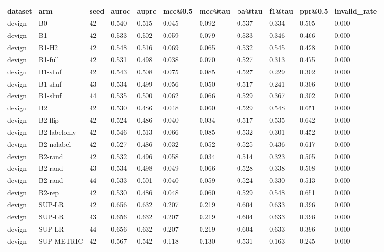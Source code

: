 \begin{tabular}{lllllllllll}
\toprule
dataset & arm & seed & auroc & auprc & mcc@0.5 & mcc@tau & ba@tau & f1@tau & ppr@0.5 & invalid\_rate \\
\midrule
devign & B0 & 42 & 0.540 & 0.515 & 0.045 & 0.092 & 0.537 & 0.334 & 0.505 & 0.000 \\
devign & B1 & 42 & 0.533 & 0.502 & 0.059 & 0.079 & 0.533 & 0.346 & 0.466 & 0.000 \\
devign & B1-H2 & 42 & 0.548 & 0.516 & 0.069 & 0.065 & 0.532 & 0.545 & 0.428 & 0.000 \\
devign & B1-full & 42 & 0.531 & 0.498 & 0.038 & 0.070 & 0.527 & 0.313 & 0.475 & 0.000 \\
devign & B1-shuf & 42 & 0.543 & 0.508 & 0.075 & 0.085 & 0.527 & 0.229 & 0.302 & 0.000 \\
devign & B1-shuf & 43 & 0.534 & 0.499 & 0.056 & 0.050 & 0.517 & 0.241 & 0.306 & 0.000 \\
devign & B1-shuf & 44 & 0.535 & 0.500 & 0.062 & 0.066 & 0.529 & 0.367 & 0.302 & 0.000 \\
devign & B2 & 42 & 0.530 & 0.486 & 0.048 & 0.060 & 0.529 & 0.548 & 0.651 & 0.000 \\
devign & B2-flip & 42 & 0.524 & 0.486 & 0.040 & 0.034 & 0.517 & 0.535 & 0.642 & 0.000 \\
devign & B2-labelonly & 42 & 0.546 & 0.513 & 0.066 & 0.085 & 0.532 & 0.301 & 0.452 & 0.000 \\
devign & B2-nolabel & 42 & 0.527 & 0.486 & 0.032 & 0.052 & 0.525 & 0.436 & 0.617 & 0.000 \\
devign & B2-rand & 42 & 0.532 & 0.496 & 0.058 & 0.034 & 0.514 & 0.323 & 0.505 & 0.000 \\
devign & B2-rand & 43 & 0.534 & 0.498 & 0.049 & 0.066 & 0.528 & 0.338 & 0.508 & 0.000 \\
devign & B2-rand & 44 & 0.533 & 0.501 & 0.040 & 0.059 & 0.524 & 0.330 & 0.513 & 0.000 \\
devign & B2-rep & 42 & 0.530 & 0.486 & 0.048 & 0.060 & 0.529 & 0.548 & 0.651 & 0.000 \\
devign & SUP-LR & 42 & 0.656 & 0.632 & 0.207 & 0.219 & 0.604 & 0.633 & 0.396 & 0.000 \\
devign & SUP-LR & 43 & 0.656 & 0.632 & 0.207 & 0.219 & 0.604 & 0.633 & 0.396 & 0.000 \\
devign & SUP-LR & 44 & 0.656 & 0.632 & 0.207 & 0.219 & 0.604 & 0.633 & 0.396 & 0.000 \\
devign & SUP-METRIC & 42 & 0.567 & 0.542 & 0.118 & 0.130 & 0.531 & 0.163 & 0.245 & 0.000 \\

\end{tabular}
